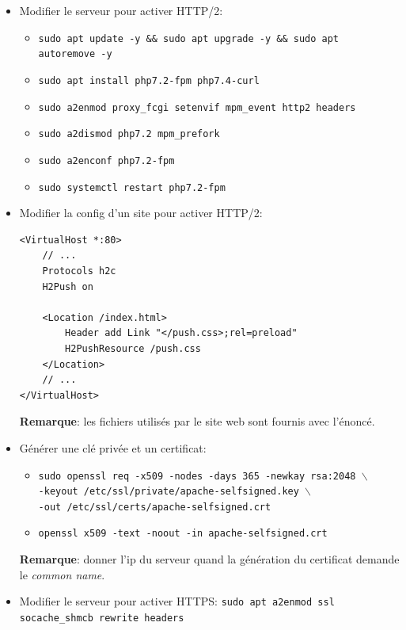 \documentclass[a4paper]{article}
\begin{document}
\begin{itemize}


\item Modifier le serveur pour activer HTTP/2:
\begin{itemize}
    \item \texttt{sudo apt update -y \&\& sudo apt upgrade -y \&\& sudo apt autoremove -y}
    \item \texttt{sudo apt install php7.2-fpm php7.4-curl}
    \item \texttt{sudo a2enmod proxy\_fcgi setenvif mpm\_event http2 headers}
    \item \texttt{sudo a2dismod php7.2 mpm\_prefork}
    \item \texttt{sudo a2enconf php7.2-fpm}
    \item \texttt{sudo systemctl restart php7.2-fpm}
\end{itemize}


\item Modifier la config d'un site pour activer HTTP/2:
\begin{example} \begin{verbatim}
<VirtualHost *:80>
    // ...
    Protocols h2c
    H2Push on

    <Location /index.html>
        Header add Link "</push.css>;rel=preload"
        H2PushResource /push.css
    </Location>
    // ...
</VirtualHost>
\end{verbatim} \end{example}
\textbf{Remarque}: les fichiers utilisés par le site web sont fournis avec l'énoncé.


\item Générer une clé privée et un certificat:
\begin{example} \begin{itemize}
    \item \texttt{sudo openssl req -x509 -nodes -days 365 -newkay rsa:2048 $\backslash$} \\
    \texttt{-keyout /etc/ssl/private/apache-selfsigned.key $\backslash$} \\
    \texttt{-out /etc/ssl/certs/apache-selfsigned.crt}
    \item \texttt{openssl x509 -text -noout -in apache-selfsigned.crt}
\end{itemize} \end{example}
\textbf{Remarque}: donner l'ip du serveur quand la génération du certificat demande le \textit{common name}.


\item Modifier le serveur pour activer HTTPS: \texttt{sudo apt a2enmod ssl socache\_shmcb rewrite headers}



\end{itemize}
\end{document}
